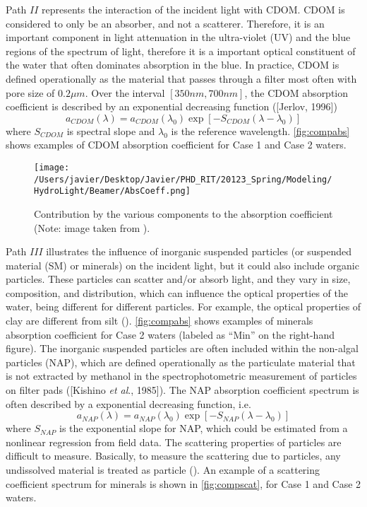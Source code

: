 Path $II$ represents the interaction of the incident light with CDOM. CDOM is considered to only be an absorber, and not a scatterer. Therefore, it is an important component in light attenuation in the ultra-violet (UV) and the blue regions of the spectrum of light, therefore it is a important optical constituent of the water that often dominates absorption in the blue. In practice, CDOM is defined operationally as the material that passes through a filter most often with pore size of $0.2\mu m$. Over the interval $[350nm,700nm]$, the CDOM absorption coefficient is described by an exponential decreasing function ([Jerlov, 1996])
\begin{equation}
  a_{CDOM}(\lambda) = a_{CDOM}(\lambda_0)\exp{\left[-S_{CDOM}(\lambda-\lambda_0)\right]}
\end{equation}
where $S_{CDOM}$ is spectral slope and $\lambda_0$ is the reference wavelength. \autoref{fig:compabs} shows examples of CDOM absorption coefficient for Case 1 and Case 2 waters.

\begin{figure}[htb]
\centering
      \texttt{[image: /Users/javier/Desktop/Javier/PHD\_RIT/20123\_Spring/Modeling/HydroLight/Beamer/AbsCoeff.png]}
      \caption{Contribution by the various components to the absorption coefficient (Note: image taken from \cite{Mobley:2001}).}
      \label{fig:compabs}
\end{figure}

Path $III$ illustrates the influence of inorganic suspended particles (or suspended material (SM) or minerals) on the incident light, but it could also include organic particles. These particles can scatter and/or absorb light, and they vary in size, composition, and distribution, which can influence the optical properties of the water, being different for different particles. For example, the optical properties of clay are different from silt (\cite{Pahlevan:2012}). \autoref{fig:compabs} shows examples of minerals absorption coefficient for Case 2 waters (labeled as ``Min'' on the right-hand figure). The inorganic suspended particles are often included within the non-algal particles (NAP), which are defined operationally as the particulate material that is not extracted by methanol in the spectrophotometric measurement of particles on filter pads ([Kishino {\it et al}., 1985]). The NAP absorption coefficient spectrum is often described by a exponential decreasing function, i.e.
\begin{equation}
  a_{NAP}(\lambda) = a_{NAP}(\lambda_0)\exp{\left[-S_{NAP}(\lambda-\lambda_0)\right]}
\end{equation}
where $S_{NAP}$ is the exponential slope for NAP, which could be estimated from a nonlinear regression from field data. The scattering properties of particles are difficult to measure. Basically, to measure the scattering due to particles, any undissolved material is treated as particle (\cite{GeraceThesis}). An example of a scattering coefficient spectrum for minerals is shown in \autoref{fig:compscat}, for Case 1 and Case 2 waters.

